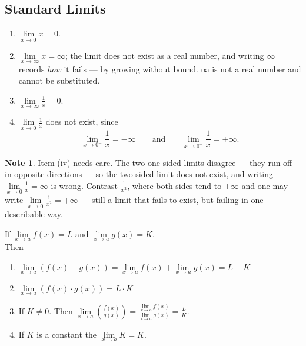 \documentclass[11pt,a4paper]{article}
\theoremstyle{definition}
\newtheorem{note}[thm]{Note}
\begin{document}
\subsection{Standard Limits}
\begin{enumerate}
\item[(i).] $\lim\limits_{x\to 0}x=0$.
\item[(ii).] $\lim\limits_{x\to\infty}x=\infty$; the limit does not exist as a real
number, and writing $\infty$ records \emph{how} it fails --- by growing without
bound. $\infty$ is not a real number and cannot be substituted.
\item[(iii).] $\lim\limits_{x\to\infty}\frac{1}{x}=0$.
\item[(iv).] $\lim\limits_{x\to 0}\frac{1}{x}$ does not exist, since
$$\lim_{x\to 0^{-}}\frac{1}{x}=-\infty
\qquad \text{and}\qquad 
\lim_{x\to 0^{+}}\frac{1}{x}=+\infty .$$
\end{enumerate}

\begin{note}
Item (iv) needs care. The two one-sided limits disagree --- they run off in opposite
directions --- so the two-sided limit does not exist, and writing
$\lim\limits_{x\to 0}\frac{1}{x}=\infty$ is wrong. Contrast $\frac{1}{x^{2}}$, where
both sides tend to $+\infty$ and one may write
$\lim\limits_{x\to 0}\frac{1}{x^{2}}=+\infty$ --- still a limit that fails to exist,
but failing in one describable way.
\end{note}

If $\lim\limits_{x\longrightarrow a}f(x)=L$ and $\lim\limits_{x\longrightarrow a}g(x)=K.$\\

Then
\begin{enumerate}
\item $\lim\limits_{x\longrightarrow a}(f(x)+g(x))=\lim\limits_{x\longrightarrow a}f(x)+\lim\limits_{x\longrightarrow a}g(x)=L+K$
\item $\lim\limits_{x\longrightarrow a} (f(x)\cdot g(x))=L\cdot K$
\item If $K\neq 0$. Then $\lim\limits_{x\longrightarrow a}\left(\frac{f(x)}{g(x)}\right)=\frac{\lim\limits_{x\longrightarrow a}f(x)}{\lim\limits_{x\longrightarrow a}g(x)}=\frac{L}{K}$.
\item If $K$ is a constant the $\lim\limits_{x\longrightarrow a} K=K$.\\\\
\end{enumerate}
\end{document}
